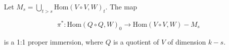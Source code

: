 Let $M_s = \bigcup_{t > s} \text{Hom}(V \circ V, W)_t$. The map

$$\pi^* : \text{Hom}(Q \circ Q, W)_0 \longrightarrow \text{Hom}(V \circ V, W) - M_s$$

is a 1:1 proper immersion, where $Q$ is a quotient of $V$ of dimension $k - s$.

